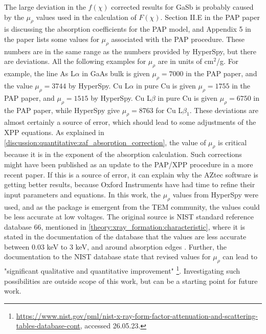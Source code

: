 
The large deviation in the $f(\chi)$ corrected results for GaSb is probably caused by the $\mu_\rho$ values used in the calculation of $F(\chi)$.
Section II.E in the PAP paper is discussing the absorption coefficients for the PAP model, and Appendix 5 \cite[p. 63]{pap_1991} in the paper lists some values for $\mu_\rho$ associated with the PAP procedure.
These numbers are in the same range as the numbers provided by HyperSpy, but there are deviations.
All the following examples for $\mu_\rho$ are in units of cm$^2$/g.
For example, the line As L$\alpha$ in GaAs bulk is given $\mu_\rho = 7000$ in the PAP paper, and the value $\mu_\rho = 3744$ by HyperSpy.
Cu L$\alpha$ in pure Cu is given $\mu_\rho = 1755$ in the PAP paper, and $\mu_\rho = 1515$ by HyperSpy.
Cu L$\beta$ in pure Cu is given $\mu_\rho = 6750$ in the PAP paper, while HyperSpy give $\mu_\rho = 8763$ for Cu L$\beta_1$.
These deviations are almost certainly a source of error, which should lead to some adjustments of the XPP equations.
As explained in \cref{discussion:quantitative:zaf_absorption_correction}, the value of $\mu_\rho$ is critical because it is in the exponent of the absorption calculation.
Such corrections might have been published as an update to the PAP/XPP procedure in a more recent paper.
If this is a source of error, it can explain why the AZtec software is getting better results, because Oxford Instruments have had time to refine their input parameters and equations.
In this work, the $\mu_\rho$ values from HyperSpy were used, and as the package is emergent from the TEM community, the values could be less accurate at low voltages.
The original source is NIST standard reference database 66, mentioned in \cref{theory:xray_formation:characteristic}, where it is stated in the documentation of the database that the values are less accurate between $0.03$ keV to $3$ keV, and around absorption edges \cite{nist_xraydatabase_hyperspy}.
Further, the documentation to the NIST database state that revised values for $\mu_\rho$ can lead to "significant qualitative and quantitative improvement" \cite{nist_xraydatabase_hyperspy}\footnote{\url{https://www.nist.gov/pml/nist-x-ray-form-factor-attenuation-and-scattering-tables-database-cont}, accessed 26.05.23.}.
Investigating such possibilities are outside scope of this work, but can be a starting point for future work.


